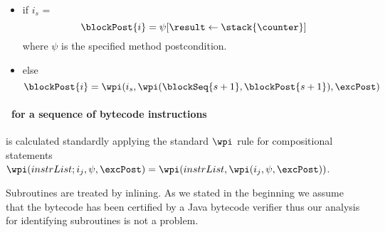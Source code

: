 \begin{defn}
\begin{itemize}
\item  if  $i_s$ =  \\
$$
   \blockPost{i } = \psi[\result \leftarrow \stack{\counter} ]    
$$
where $\psi $ is the specified method postcondition.
\item  else  
 $$ \blockPost{i} =  \wpi(  i_s , \wpi( \blockSeq{s+1} ,  \blockPost{ s  +1} ) , \excPost)  $$ 
 \end{itemize}
\end{defn}

\paragraph{\wpi \ for a sequence of bytecode instructions} is calculated standardly applying the standard $\wpi$ rule for compositional statements $\wpi( instrList;i_{j}, \psi,\excPost ) =\wpi(instrList, \wpi(i_{j}, \psi,\excPost )) $. %



Subroutines are treated by inlining. As we stated in the beginning we assume that the bytecode has been certified by a Java
bytecode verifier thus our analysis for identifying  subroutines is not a problem.  


